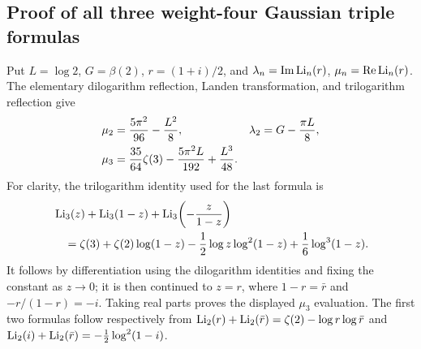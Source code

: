 \subsection{Proof of all three weight-four Gaussian triple formulas}
\label{subsec:gaussian-triples}

Put $L=\log2$, $G=\beta(2)$, $r=(1+i)/2$, and
$\lambda_n=\operatorname{Im}\operatorname{Li}_n(r)$,
$\mu_n=\operatorname{Re}\operatorname{Li}_n(r)$. The elementary dilogarithm reflection,
Landen transformation, and trilogarithm reflection give
\begin{align}
 \mu_2&=\frac{5\pi^2}{96}-\frac{L^2}{8},&
 \lambda_2&=G-\frac{\pi L}{8},\notag\\
 \mu_3&=\frac{35}{64}\zeta(3)-\frac{5\pi^2L}{192}
                       +\frac{L^3}{48}.
 \label{eq:halfpoint-auxiliary}
\end{align}
For clarity, the trilogarithm identity used for the last formula is
\begin{align*}
 &\operatorname{Li}_3(z)+\operatorname{Li}_3(1-z)+\operatorname{Li}_3\!\left(-\frac{z}{1-z}\right)\\
 &\quad=\zeta(3)+\zeta(2)\log(1-z)
  -\frac12\log z\log^2(1-z)+\frac16\log^3(1-z).
\end{align*}
It follows by differentiation using the dilogarithm identities and fixing
the constant as $z\to0$; it is then continued to $z=r$, where
$1-r=\bar r$ and $-r/(1-r)=-i$. Taking real parts proves the displayed
$\mu_3$ evaluation. The first two formulas follow respectively from
$\operatorname{Li}_2(r)+\operatorname{Li}_2(\bar r)=\zeta(2)-\log r\log\bar r$ and
$\operatorname{Li}_2(i)+\operatorname{Li}_2(\bar r)=-\tfrac12\log^2(1-i)$.

